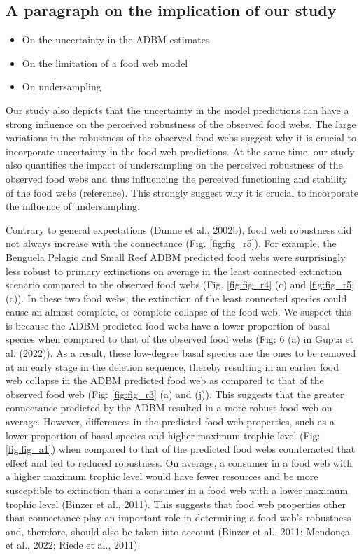 \documentclass{article}
\providecommand{\tightlist}{%
  \setlength{\itemsep}{0pt}\setlength{\parskip}{0pt}}
\begin{document}
\hypertarget{a-paragraph-on-the-implication-of-our-study}{%
\subsection{A paragraph on the implication of our
study}\label{a-paragraph-on-the-implication-of-our-study}}

\begin{itemize}
\tightlist
\item
  On the uncertainty in the ADBM estimates
\item
  On the limitation of a food web model
\item
  On undersampling
\end{itemize}

Our study also depicts that the uncertainty in the model predictions can
have a strong influence on the perceived robustness of the observed food
webs. The large variations in the robustness of the observed food webs
suggest why it is crucial to incorporate uncertainty in the food web
predictions. At the same time, our study also quantifies the impact of
undersampling on the perceived robustness of the observed food webs and
thus influencing the perceived functioning and stability of the food
webs (reference). This strongly suggest why it is crucial to incorporate
the influence of undersampling.

Contrary to general expectations (Dunne et al., 2002b), food web
robustness did not always increase with the connectance (Fig.
\ref{fig:fig_r5}). For example, the Benguela Pelagic and Small Reef ADBM
predicted food webs were surprisingly less robust to primary extinctions
on average in the least connected extinction scenario compared to the
observed food webs (Fig. \ref{fig:fig_r4} (c) and \ref{fig:fig_r5} (c)).
In these two food webs, the extinction of the least connected species
could cause an almost complete, or complete collapse of the food web. We
suspect this is because the ADBM predicted food webs have a lower
proportion of basal species when compared to that of the observed food
webs (Fig: 6 (a) in Gupta et al. (2022)). As a result, these low-degree
basal species are the ones to be removed at an early stage in the
deletion sequence, thereby resulting in an earlier food web collapse in
the ADBM predicted food web as compared to that of the observed food web
(Fig: \ref{fig:fig_r3} (a) and (j)). This suggests that the greater
connectance predicted by the ADBM resulted in a more robust food web on
average. However, differences in the predicted food web properties, such
as a lower proportion of basal species and higher maximum trophic level
(Fig: \ref{fig:fig_a1}) when compared to that of the predicted food webs
counteracted that effect and led to reduced robustness. On average, a
consumer in a food web with a higher maximum trophic level would have
fewer resources and be more susceptible to extinction than a consumer in
a food web with a lower maximum trophic level (Binzer et al., 2011).
This suggests that food web properties other than connectance play an
important role in determining a food web's robustness and, therefore,
should also be taken into account (Binzer et al., 2011; Mendonça et al.,
2022; Riede et al., 2011).
\end{document}
